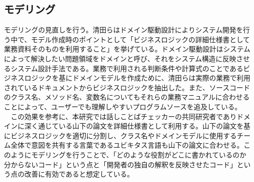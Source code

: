\documentclass[12pt, a4paper]{jreport}
\begin{document}
\subsection{モデリング}
モデリングの見直しを行う。清田らはドメイン駆動設計によりシステム開発を行う中で、モデル作成時のポイントとして「ビジネスロジックの詳細仕様書として業務資料そのものを利用すること」を挙げている。ドメイン駆動設計はシステムによって解決したい問題領域をドメインと呼び、それをシステム構造に反映させるシステム設計手法である。業務で利用される判断条件や計算式のことであるビジネスロジックを基にドメインモデルを作成ために、清田らは実際の業務で利用されているドキュメントからビジネスロジックを抽出した。また、ソースコードのクラス名、メソッド名、変数名についてもそれらの業務マニュアルに合わせることによって、ユーザーでも理解しやすいプログラムソースを追及している。
\\　この効果を参考に、本研究では話しことばチェッカーの共同研究者でありドメインに深く通じている山下の論文を詳細仕様書として利用する。山下の論文を基にビジネスロジックを適切に分割し、クラス名やドメインモデルに使用するチーム全体で意図を共有する言葉であるユビキタス言語も山下の論文に合わせる。このようにモデリングを行うことで、「どのような役割がどこに書かれているのか分からないコード」という点と「開発者の独自の解釈を反映させたコード」という点の改善に有効であると想定している。
\end{document}
